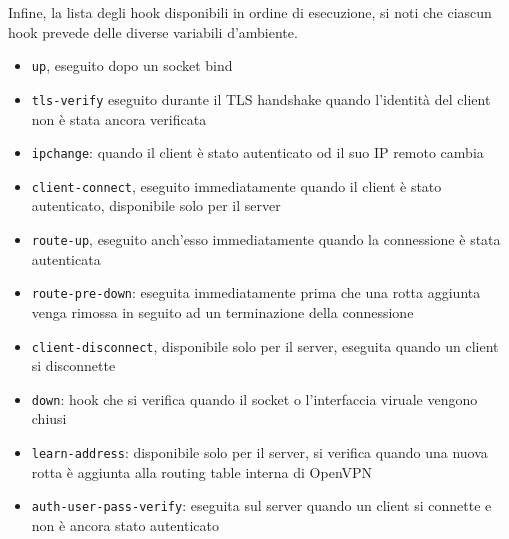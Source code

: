 Infine, la lista degli hook disponibili in ordine di esecuzione, si noti che ciascun hook
prevede delle diverse
variabili d'ambiente.
\begin{itemize}
	\item \texttt{up}, eseguito dopo un socket bind
	\item \texttt{tls-verify} eseguito durante il TLS handshake quando l'identità
	      del client non è stata ancora verificata
	\item \texttt{ipchange}: quando il client è stato autenticato od il suo IP remoto
	      cambia
	\item \texttt{client-connect}, eseguito immediatamente quando il client è stato
	      autenticato, disponibile solo per il server
	\item \texttt{route-up}, eseguito anch'esso immediatamente quando la connessione è stata
	      autenticata
	\item \texttt{route-pre-down}: eseguita immediatamente prima che una rotta aggiunta venga
	      rimossa in seguito ad un terminazione della connessione
	\item \texttt{client-disconnect}, disponibile solo per il server, eseguita quando
	      un client si disconnette
	\item \texttt{down}: hook che si verifica quando il socket o l'interfaccia viruale vengono
	      chiusi
	\item \texttt{learn-address}: disponibile solo per il server, si verifica quando una nuova rotta
	      è aggiunta alla routing table interna di OpenVPN
	\item \texttt{auth-user-pass-verify}: eseguita sul server quando un client si connette
	      e non è ancora stato autenticato
\end{itemize}

